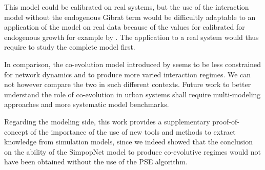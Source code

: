 

This model could be calibrated on real systems, but the use of the interaction model without the endogenous Gibrat term would be difficultly adaptable to an application of the model on real data because of the values for calibrated for endogenous growth for example by \cite{raimbault2018indirect}. The application to a real system would thus require to study the complete model first.



In comparison, the co-evolution model introduced by \cite{2018arXiv180409430R} seems to be less constrained for network dynamics and to produce more varied interaction regimes. We can not however compare the two in such different contexts. Future work to better understand the role of co-evolution in urban systems shall require multi-modeling approaches \cite{cottineau2015modular} and more systematic model benchmarks.



Regarding the modeling side, this work provides a supplementary proof-of-concept of the importance of the use of new tools and methods to extract knowledge from simulation models, since we indeed showed that the conclusion on the ability of the SimpopNet model to produce co-evolutive regimes would not have been obtained without the use of the PSE algorithm.



